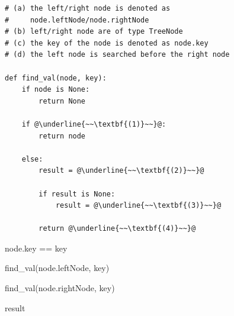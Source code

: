 \documentclass[11pt,addpoints,answers]{exam}
\begin{document}
\begin{questions}
\begin{parts}
\begin{lstlisting}[escapechar=@]
# (a) the left/right node is denoted as
#     node.leftNode/node.rightNode
# (b) left/right node are of type TreeNode
# (c) the key of the node is denoted as node.key
# (d) the left node is searched before the right node
        
def find_val(node, key):
    if node is None:
        return None
        
    if @\underline{~~\textbf{(1)}~~}@:
        return node
        
    else:
        result = @\underline{~~\textbf{(2)}~~}@
            
        if result is None:
            result = @\underline{~~\textbf{(3)}~~}@
            
        return @\underline{~~\textbf{(4)}~~}@
    \end{lstlisting}
    
    \begin{your_code_solution_outer}[height=1.75cm, width=\textwidth, title={Python code for missing field \textbf{(1)}}]
    \begin{your_code_solution}
    node.key == key
    \end{your_code_solution}
    \end{your_code_solution_outer}
    
    
    \begin{your_code_solution_outer}[height=1.75cm, width=\textwidth, title={Python code for missing field \textbf{(2)}}]
    \begin{your_code_solution}
    find_val(node.leftNode, key)
    \end{your_code_solution}
    \end{your_code_solution_outer}
    
    
    \begin{your_code_solution_outer}[height=1.75cm, width=\textwidth, title={Python code for missing field \textbf{(3)}}]
    \begin{your_code_solution}
    find_val(node.rightNode, key)
    \end{your_code_solution}
    \end{your_code_solution_outer}
    
    
    \begin{your_code_solution_outer}[height=1.75cm, width=\textwidth, title={Python code for missing field \textbf{(4)}}]
    \begin{your_code_solution}
    result
    \end{your_code_solution}
    \end{your_code_solution_outer}
    

\end{parts}
\end{questions}
\end{document}
